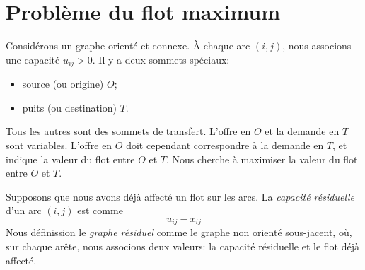 \section{Problème du flot maximum}

Considérons un graphe orienté et connexe.
\`A chaque arc $(i,j)$, nous associons une capacité $u_{ij} > 0$.
Il y a deux sommets spéciaux:
\begin{itemize}
 \item 
 source (ou origine) $O$;
 \item
 puits (ou destination) $T$.
\end{itemize}
Tous les autres sont des sommets de transfert.
L'offre en $O$ et la demande en $T$ sont variables.
L'offre en $O$ doit cependant correspondre à la demande en $T$, et indique la valeur du flot entre $O$ et $T$.
Nous cherche à maximiser la valeur du flot entre $O$ et $T$.

Supposons que nous avons déjà affecté un flot sur les arcs.
La {\sl capacité résiduelle} d'un arc $(i,j)$ est comme
\[
  u_{ij} - x_{ij}
\]
Nous définission le {\sl graphe résiduel} comme le graphe non orienté sous-jacent, où, sur chaque arête, nous associons deux valeurs: la capacité résiduelle et le flot déjà affecté.

